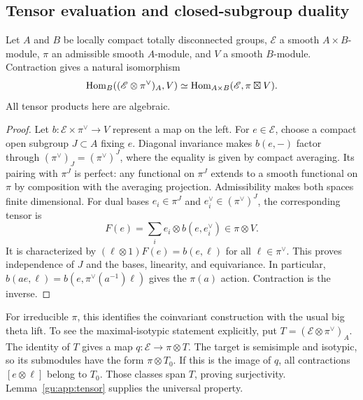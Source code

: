 \label{gu:app:functional}
\subsection{Tensor evaluation and closed-subgroup duality}
\begin{lemma}\label{gu:app:tensor}\label{fun:tensor}
Let $A$ and $B$ be locally compact totally disconnected groups,
$\mathscr E$ a smooth $A\times B$-module, $\pi$ an admissible smooth
$A$-module, and $V$ a smooth $B$-module. Contraction gives a natural
isomorphism
\begin{equation}\label{gu:eq:tensor-lemma}
 \operatorname{Hom}_B((\mathscr E\otimes\pi^\vee)_A,V)
 \simeq\operatorname{Hom}_{A\times B}(\mathscr E,\pi\boxtimes V).
\end{equation}
All tensor products here are algebraic.
\end{lemma}
\begin{proof}
Let $b:\mathscr E\times\pi^\vee\to V$ represent a map on the left.
For $e\in\mathscr E$, choose a compact open subgroup $J\subset A$
fixing $e$. Diagonal invariance makes $b(e,-)$ factor through
$(\pi^\vee)_J=(\pi^\vee)^J$, where the equality is given by compact
averaging. Its pairing with $\pi^J$ is perfect: any functional on
$\pi^J$ extends to a smooth functional on $\pi$ by composition with
the averaging projection. Admissibility makes both spaces finite
dimensional. For dual bases $e_i\in\pi^J$ and
$e_i^\vee\in(\pi^\vee)^J$, the corresponding tensor is
\[
 F(e)=\sum_i e_i\otimes b(e,e_i^\vee)\in\pi\otimes V.
\]
It is characterized by $(\ell\otimes1)F(e)=b(e,\ell)$ for all
$\ell\in\pi^\vee$. This proves independence of $J$ and the bases,
linearity, and equivariance. In particular,
$b(ae,\ell)=b(e,\pi^\vee(a^{-1})\ell)$ gives the $\pi(a)$
action. Contraction is the inverse. 
\end{proof}

For irreducible \(\pi\), this identifies the coinvariant construction
with the usual big theta lift. To see the maximal-isotypic
statement explicitly, put \(T=(\mathscr E\otimes\pi^\vee)_A\).
The identity of \(T\) gives a map \(q:\mathscr E\to\pi\otimes T\).
The target is semisimple and isotypic, so its submodules have the
form \(\pi\otimes T_0\). If this is the image of \(q\), all
contractions \([e\otimes\ell]\) belong to \(T_0\). Those classes
span \(T\), proving surjectivity. Lemma~\ref{gu:app:tensor} supplies
the universal property.


